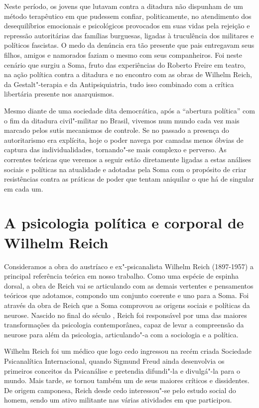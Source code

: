 Neste período, os jovens que lutavam contra a ditadura não dispunham de
um método terapêutico em que pudessem confiar, politicamente, no
atendimento dos desequilíbrios emocionais e psicológicos provocados em
suas vidas pela rejeição e repressão autoritárias das famílias
burguesas, ligadas à truculência dos militares e políticos fascistas. O
medo da denúncia era tão presente que pais entregavam seus filhos,
amigos e namorados faziam o mesmo com seus companheiros. Foi neste
cenário que surgiu a Soma, fruto das experiências do Roberto Freire
em teatro, na ação política contra a ditadura e no encontro com as obras
de Wilhelm Reich, da Gestalt"-terapia e da Antipsiquiatria, tudo isso
combinado com a crítica libertária presente nos anarquismos.

Mesmo diante de uma sociedade dita democrática, após a ``abertura
política'' com o fim da ditadura civil"-militar no Brasil, vivemos num
mundo cada vez mais marcado pelos sutis mecanismos de controle. Se no
passado a presença do autoritarismo era explícita, hoje o poder navega
por camadas menos óbvias de captura das individualidades, tornando"-se
mais complexo e perverso. As correntes teóricas que veremos a seguir
estão diretamente ligadas a estas análises sociais e políticas na
atualidade e adotadas pela Soma com o propósito de criar resistências
contra as práticas de poder que tentam aniquilar o que há de singular em
cada um.

\section{A psicologia política e corporal de Wilhelm Reich}

Consideramos a obra do austríaco e ex"-psicanalista Wilhelm Reich
(1897-1957) a principal referência teórica em nosso trabalho. Como uma
espécie de espinha dorsal, a obra de Reich vai se articulando com as
demais vertentes e pensamentos teóricos que adotamos, compondo um
conjunto coerente e uno para a Soma. Foi através da obra de Reich que a
Soma comprovou as origens sociais e políticas da neurose. Nascido no
final do século , Reich foi responsável por uma das maiores
transformações da psicologia contemporânea, capaz de levar a compreensão
da neurose para além da psicologia, articulando"-a com a sociologia e a
política.

Wilhelm Reich foi um médico que logo cedo ingressou na recém criada
Sociedade Psicanalítica Internacional, quando Sigmund Freud ainda
desenvolvia os primeiros conceitos da Psicanálise e pretendia difundi"-la
e divulgá"-la para o mundo. Mais tarde, se tornou também um de seus
maiores críticos e dissidentes. De origem camponesa, Reich desde cedo
interessou"-se pelo estudo social do homem, sendo um ativo militante nas
várias atividades em que participou.

